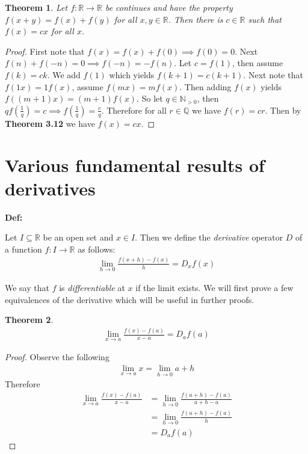 \documentclass{article}
\theoremstyle{plain}
\newtheorem{theorem}{Theorem}
\theoremstyle{definition}
\begin{document}
\begin{theorem}
	Let $f: \mathbb{R} \rightarrow \mathbb{R}$ be continues and have the
	property $f(x+y) = f(x) + f(y)$ for all $x,y \in \mathbb{R}$. Then there is
	$c \in \mathbb{R}$ such that $f(x)=cx$ for all $x$.
\end{theorem}
\begin{proof}
	First note that $f(x)=f(x)+f(0)\implies f(0)=0$. Next $f(n)+f(-n) = 0
	\implies f(-n) = - f(n)$. Let $c = f(1)$, then assume $f(k) = ck$. We add
	$f(1)$ which yields $f(k+1) = c(k+1)$. Next note that $f(1x) = 1 f(x)$,
	assume $f(mx) = m f(x)$. Then adding $f(x)$ yields $f((m+1)x) = (m+1)f(x)$.
	So let $q \in \mathbb{N}_{>0}$, then $qf(\frac{1}{q}) = c \implies
	f(\frac{1}{q}) = \frac{c}{q}$. Therefore for all $r \in \mathbb{Q}$ we have
	$f(r)=cr$. Then by \textbf{Theorem 3.12} we have $f(x)=cx$.
\end{proof}

\section{Various fundamental results of derivatives}

\textbf{Def:} 

Let $I \subseteq \mathbb{R}$ be an open set and $x \in I$. Then we define the 
\textit{derivative} operator $D$ of a function $f: I \rightarrow \mathbb{R}$ as 
follows:
\begin{align}
    \lim_{h \rightarrow 0} \frac{f(x+h)-f(x)}{h} = D_x f(x)
\end{align}

We say that $f$ is \textit{differentiable} at $x$ if the limit exists. We
will first prove a few equivalences of the derivative which will be useful
in further proofs.

\begin{theorem}
\begin{align}
    \lim_{x \rightarrow a} \frac{f(x)-f(a)}{x-a} = D_a f(a)
\end{align}
\end{theorem}
\begin{proof}
Observe the following
\begin{align}
    \lim_{x \rightarrow a} x = \lim_{h \rightarrow 0} a+h
\end{align}
Therefore
\begin{align}
    \lim_{x \rightarrow a} \frac{f(x)-f(a)}{x-a} &= 
    \lim_{h \rightarrow 0} \frac{f(a+h)-f(a)}{a+h-a} \\ \nonumber
    &= \lim_{h \rightarrow 0} \frac{f(a+h)-f(a)}{h} \\ \nonumber
    &= D_a f(a)
\end{align}
\end{proof}
\end{document}
